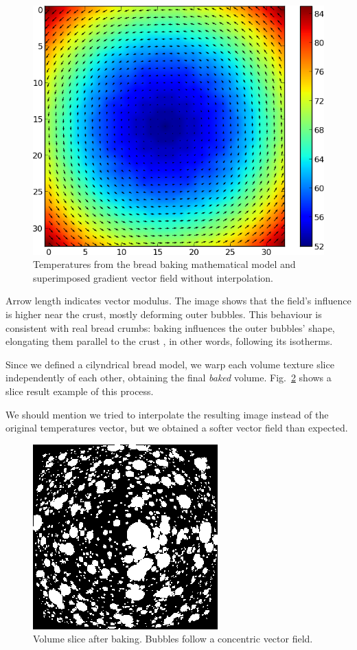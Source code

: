 \documentclass[final,5p,times]{elsarticle}
\begin{document}
{\begin{figure}
\includegraphics[scale=0.58]{vfield.png}
\caption{Temperatures from the bread baking mathematical model and superimposed gradient vector field without interpolation.}
\label{FigBakingVectorField}
\end{figure}

Arrow length indicates vector modulus. The image shows that the field's influence is higher near the crust, mostly deforming outer bubbles. This behaviour is consistent with real bread crumbs: baking influences the outer bubbles' shape, elongating them parallel to the crust \cite{Scanlon2001}, in other words, following its isotherms.

Since we defined a cilyndrical bread model, we warp each volume texture slice independently of each other, obtaining the final {\em baked} volume. Fig.~\ref{FigBaking} shows a slice result example of this process.

We should mention we tried to interpolate the resulting image instead of the original temperatures vector, but we obtained a softer vector field than expected.

\begin{figure}
\begin{center}
\includegraphics[scale=0.8]{baking.png}
\caption{Volume slice after baking. Bubbles follow a concentric vector field. }
\label{FigBaking}
\end{center}
\end{figure}

}
\end{document}
